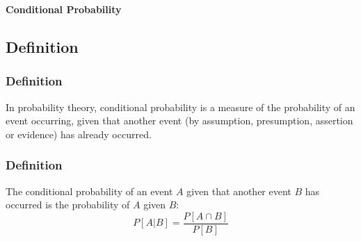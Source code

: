 \begin{frame}
    \Huge
    \begin{center}
        \textbf{Conditional Probability}
    \end{center}
\end{frame}

\subsection{Definition}\label{subsec:definition2}
\begin{frame}
    \frametitle{Definition}
    \begin{block}{}
        In probability theory, conditional probability is a measure of the probability of an event occurring, given that another event (by assumption, presumption, assertion or evidence) has already occurred.
    \end{block}
\end{frame}
\begin{frame}
    \frametitle{Definition}
    \begin{block}{}
        The conditional probability of an event $A$ given that another event $B$ has occurred is the probability of $A$ given $B$:
        \begin{equation}
            P[A|B] = \frac{P[A \cap B]}{P[B]}\label{eq:equation21}
        \end{equation}
    \end{block}
\end{frame}
